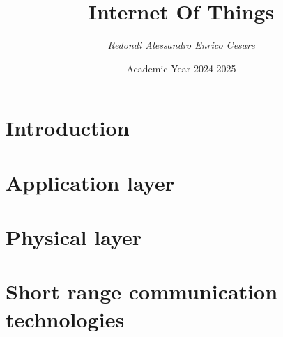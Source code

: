 \documentclass[12pt, a4paper]{report}
\title{\textbf{Internet Of Things}}
\author{\textit{Redondi Alessandro Enrico Cesare}}
\date{Academic Year 2024-2025}
\begin{document}
    \maketitle

    

    \cleardoublepage{}

    \tableofcontents

    \cleardoublepage{}

    \chapter{Introduction}
    
    
    

    \chapter{Application layer}
    
    
    
    

    \chapter{Physical layer}
    
    
    

    \chapter{Short range communication technologies}
    
    
    
    
    
\end{document}
